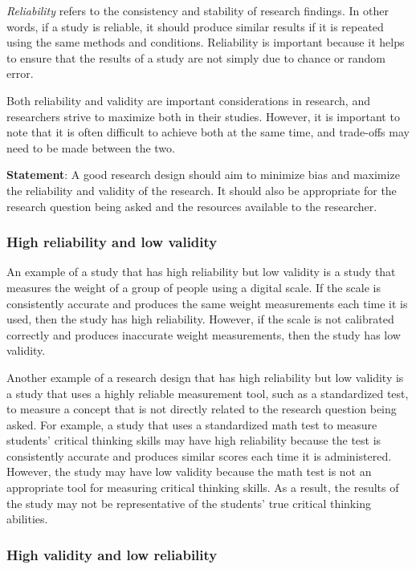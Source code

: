 \documentclass[
  12pt,
  oneside]{book}
\theoremstyle{definition}
\theoremstyle{definition}
\theoremstyle{definition}
\theoremstyle{definition}
\theoremstyle{remark}
\begin{document}
\emph{Reliability} refers to the consistency and stability of research findings. In other words, if a study is reliable, it should produce similar results if it is repeated using the same methods and conditions. Reliability is important because it helps to ensure that the results of a study are not simply due to chance or random error.

Both reliability and validity are important considerations in research, and researchers strive to maximize both in their studies. However, it is important to note that it is often difficult to achieve both at the same time, and trade-offs may need to be made between the two.

\textbf{Statement}: A good research design should aim to minimize bias and maximize the reliability and validity of the research. It should also be appropriate for the research question being asked and the resources available to the researcher.

\hypertarget{high-reliability-and-low-validity}{%
\subsubsection*{High reliability and low validity}\label{high-reliability-and-low-validity}}

An example of a study that has high reliability but low validity is a study that measures the weight of a group of people using a digital scale. If the scale is consistently accurate and produces the same weight measurements each time it is used, then the study has high reliability. However, if the scale is not calibrated correctly and produces inaccurate weight measurements, then the study has low validity.

Another example of a research design that has high reliability but low validity is a study that uses a highly reliable measurement tool, such as a standardized test, to measure a concept that is not directly related to the research question being asked. For example, a study that uses a standardized math test to measure students' critical thinking skills may have high reliability because the test is consistently accurate and produces similar scores each time it is administered. However, the study may have low validity because the math test is not an appropriate tool for measuring critical thinking skills. As a result, the results of the study may not be representative of the students' true critical thinking abilities.

\hypertarget{high-validity-and-low-reliability}{%
\subsubsection*{High validity and low reliability}\label{high-validity-and-low-reliability}}
\end{document}

